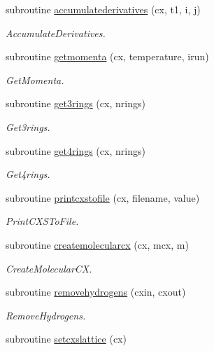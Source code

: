 \begin{DoxyCompactItemize}
subroutine \mbox{\hyperlink{namespacechemstr_aef17d31cdb1cd38fb760b5751f79ca85}{accumulatederivatives}} (cx, t1, i, j)
\begin{DoxyCompactList}\small\item\em Accumulate\+Derivatives. \end{DoxyCompactList}\item 
subroutine \mbox{\hyperlink{namespacechemstr_ab195fd63cf5ba3005a33b81ad5a2608a}{getmomenta}} (cx, temperature, irun)
\begin{DoxyCompactList}\small\item\em Get\+Momenta. \end{DoxyCompactList}\item 
subroutine \mbox{\hyperlink{namespacechemstr_a591122df70e3868553ad901347346998}{get3rings}} (cx, nrings)
\begin{DoxyCompactList}\small\item\em Get3rings. \end{DoxyCompactList}\item 
subroutine \mbox{\hyperlink{namespacechemstr_a82765d5adc1ce177f662c280af854725}{get4rings}} (cx, nrings)
\begin{DoxyCompactList}\small\item\em Get4rings. \end{DoxyCompactList}\item 
subroutine \mbox{\hyperlink{namespacechemstr_ab5a731a94c47cefa1b1b0683a19819fa}{printcxstofile}} (cx, filename, value)
\begin{DoxyCompactList}\small\item\em Print\+C\+X\+S\+To\+File. \end{DoxyCompactList}\item 
subroutine \mbox{\hyperlink{namespacechemstr_a3e7d49062cb6814286622fa8f5485ecf}{createmolecularcx}} (cx, mcx, m)
\begin{DoxyCompactList}\small\item\em Create\+Molecular\+CX. \end{DoxyCompactList}\item 
subroutine \mbox{\hyperlink{namespacechemstr_a7f2064b2aad1d074c52548acc68d91a2}{removehydrogens}} (cxin, cxout)
\begin{DoxyCompactList}\small\item\em Remove\+Hydrogens. \end{DoxyCompactList}\item 
subroutine \mbox{\hyperlink{namespacechemstr_af6a21c24e09efcd5811cd28bcc4347e6}{setcxslattice}} (cx)

\end{DoxyCompactItemize}
